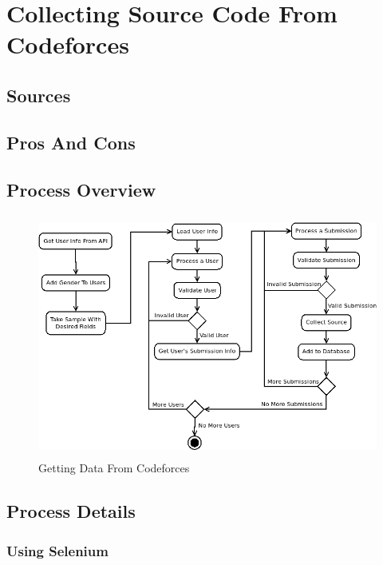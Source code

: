 \documentclass{article}
\begin{document}
\section{Collecting Source Code From Codeforces}


\subsection{Sources}


\subsection{Pros And Cons}


\subsection{Process Overview}

\begin{figure}[!h]
    \centering
    \includegraphics[height=8cm]{diagrams/cf_process.png}
    \caption{Getting Data From Codeforces}
\end{figure}


\subsection{Process Details}

\subsubsection{Using Selenium}
\end{document}
